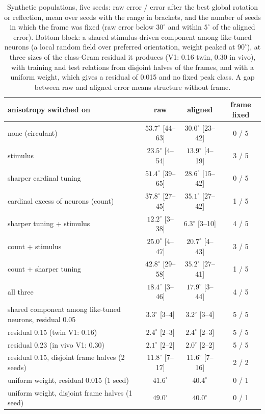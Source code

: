 \documentclass[11pt]{article}
\begin{document}
\begin{table}[htbp]
  \centering\footnotesize
  \caption{Synthetic populations, five seeds: raw error / error after the best global rotation or reflection, mean over seeds with the range in brackets, and the number of seeds in which the frame was fixed (raw error below $30^\circ$ and within $5^\circ$ of the aligned error). Bottom block: a shared stimulus-driven component among like-tuned neurons (a local random field over preferred orientation, weight peaked at $90^\circ$), at three sizes of the class-Gram residual it produces (V1: 0.16 twin, 0.30 in vivo), with training and test relations from disjoint halves of the frames, and with a uniform weight, which gives a residual of 0.015 and no fixed peak class. A gap between raw and aligned error means structure without frame.}
  \label{tab:syn}
  \begin{tabular}{lccc}
    \toprule
    anisotropy switched on & raw & aligned & frame fixed \\
    \midrule
    none (circulant) & $53.7^\circ$ [44--63] & $30.0^\circ$ [23--42] & 0 / 5 \\
    stimulus & $23.5^\circ$ [4--54] & $13.9^\circ$ [4--19] & 3 / 5 \\
    sharper cardinal tuning & $51.4^\circ$ [39--65] & $28.6^\circ$ [15--42] & 0 / 5 \\
    cardinal excess of neurons (count) & $37.8^\circ$ [27--45] & $35.1^\circ$ [27--42] & 1 / 5 \\
    sharper tuning + stimulus & $12.2^\circ$ [3--38] & $6.3^\circ$ [3--10] & 4 / 5 \\
    count + stimulus & $25.0^\circ$ [4--47] & $20.7^\circ$ [4--43] & 3 / 5 \\
    count + sharper tuning & $42.8^\circ$ [29--58] & $35.2^\circ$ [27--41] & 1 / 5 \\
    all three & $18.4^\circ$ [3--46] & $17.9^\circ$ [3--44] & 4 / 5 \\
    \midrule
    shared component among like-tuned neurons, residual 0.05 & $3.3^\circ$ [3--4] & $3.2^\circ$ [3--4] & 5 / 5 \\
    \quad residual 0.15 (twin V1: 0.16) & $2.4^\circ$ [2--3] & $2.4^\circ$ [2--3] & 5 / 5 \\
    \quad residual 0.23 (in vivo V1: 0.30) & $2.1^\circ$ [2--2] & $2.0^\circ$ [2--2] & 5 / 5 \\
    \quad residual 0.15, disjoint frame halves (2 seeds) & $11.8^\circ$ [7--17] & $11.6^\circ$ [7--16] & 2 / 2 \\
    \quad uniform weight, residual 0.015 (1 seed) & $41.6^\circ$ & $40.4^\circ$ & 0 / 1 \\
    \quad uniform weight, disjoint frame halves (1 seed) & $49.0^\circ$ & $40.0^\circ$ & 0 / 1 \\
    \bottomrule
  \end{tabular}
\end{table}
\end{document}
